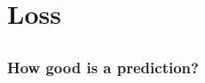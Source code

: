 \section{Loss}

\subsection{}

\begin{frame}
    \frametitle{How good is a prediction?}
    
\end{frame}

